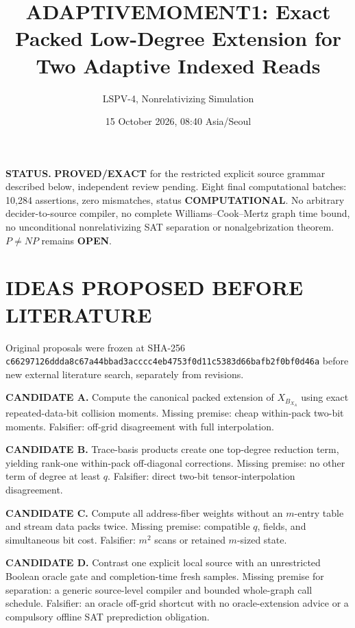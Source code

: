 \documentclass[11pt]{article}
\title{ADAPTIVEMOMENT1: Exact Packed Low-Degree Extension for Two Adaptive Indexed Reads}
\author{LSPV-4, Nonrelativizing Simulation}
\date{15 October 2026, 08:40 Asia/Seoul}
\begin{document}
\maketitle
\noindent\textbf{STATUS.} \textbf{PROVED/EXACT} for the restricted explicit source grammar described below, independent review pending. Eight final computational batches: 10,284 assertions, zero mismatches, status \textbf{COMPUTATIONAL}. No arbitrary decider-to-source compiler, no complete Williams--Cook--Mertz graph time bound, no unconditional nonrelativizing SAT separation or nonalgebrization theorem. $P\ne NP$ remains \textbf{OPEN}.

\section{IDEAS PROPOSED BEFORE LITERATURE}
Original proposals were frozen at SHA-256 \texttt{c66297126ddda8c67a44bbad3acccc4eb4753f0d11c5383d66bafb2f0bf0d46a} before new external literature search, separately from revisions.
\par\noindent\textbf{CANDIDATE A.} Compute the canonical packed extension of $X_{B_{X_A}}$ using exact repeated-data-bit collision moments. Missing premise: cheap within-pack two-bit moments. Falsifier: off-grid disagreement with full interpolation.
\par\noindent\textbf{CANDIDATE B.} Trace-basis products create one top-degree reduction term, yielding rank-one within-pack off-diagonal corrections. Missing premise: no other term of degree at least $q$. Falsifier: direct two-bit tensor-interpolation disagreement.
\par\noindent\textbf{CANDIDATE C.} Compute all address-fiber weights without an $m$-entry table and stream data packs twice. Missing premise: compatible $q$, fields, and simultaneous bit cost. Falsifier: $m^2$ scans or retained $m$-sized state.
\par\noindent\textbf{CANDIDATE D.} Contrast one explicit local source with an unrestricted Boolean oracle gate and completion-time fresh samples. Missing premise for separation: a generic source-level compiler and bounded whole-graph call schedule. Falsifier: an oracle off-grid shortcut with no oracle-extension advice or a compulsory offline SAT preprediction obligation.
\end{document}
